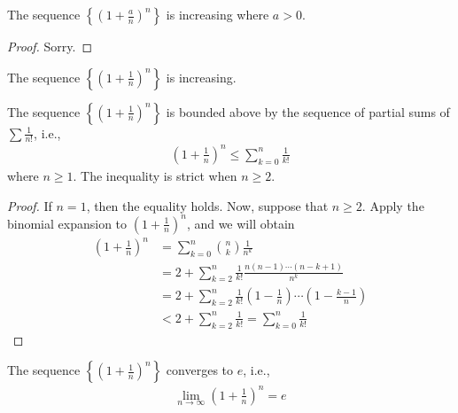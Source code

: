 \documentclass[thmcnt=section, 12pt]{elegantbook}
\begin{document}

\begin{lemma}
    The sequence $\left\{ \left( 1 + \frac{a}{n} \right)^n \right\}$ is increasing where $a > 0$.
\end{lemma}

\begin{proof}
    Sorry.
\end{proof}

\begin{theorem}
    The sequence $\left\{ \left( 1 + \frac{1}{n} \right)^n \right\}$ is increasing.
\end{theorem}


\begin{lemma} \label{lem:1}
    The sequence $\left\{\left(1+\frac{1}{n}\right)^n\right\}$ is bounded above by the sequence of partial sums of $\sum \frac{1}{n!}$, i.e., 
    \begin{align*}
        \left(1+\frac{1}{n}\right)^n \leq \sum_{k=0}^{n} \frac{1}{k!}
    \end{align*}
    where $n \geq 1$. The inequality is strict when $n \geq 2$.
\end{lemma}

\begin{proof}
    If $n = 1$, then the equality holds. Now, suppose that $n \geq 2$.
    Apply the binomial expansion to $\left(1+\frac{1}{n}\right)^n$, and we will obtain
    \begin{align*}
        \left(1+\frac{1}{n}\right)^n 
        &= \sum_{k=0}^{n} \binom{n}{k} \frac{1}{n^k} \\
        &= 2 + \sum_{k=2}^{n} \frac{1}{k!} \frac{n(n-1) \cdots (n-k+1)}{n^k} \\ 
        &= 2 + \sum_{k=2}^{n} \frac{1}{k!} \left(1 - \frac{1}{n}\right) \cdots \left(1 - \frac{k-1}{n}\right) \\ 
        &< 2 + \sum_{k=2}^{n} \frac{1}{k!}
        = \sum_{k=0}^{n} \frac{1}{k!}
    \end{align*}
\end{proof}


\begin{theorem}
    The sequence $\left\{\left(1+\frac{1}{n}\right)^n\right\}$ converges to $e$, i.e., 
    \begin{align*}
        \lim_{n \to \infty} \left( 1 + \frac{1}{n} \right)^n = e
    \end{align*}
\end{theorem}
\end{document}
